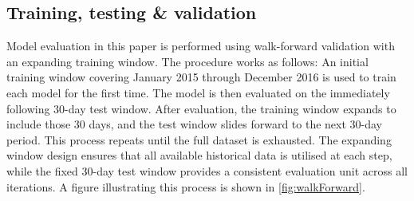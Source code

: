 \subsection{Training, testing \& validation}\label{sec:split_protocol}
Model evaluation in this paper is performed using walk-forward validation with 
an expanding training window. The procedure works as follows: An initial 
training window covering January 2015 through December 2016 is used to train
each model for the first time. The model is then evaluated on
the immediately following 30-day test window. After evaluation,
the training window expands to include those 30 days, and
the test window slides forward to the next 30-day period.
This process repeats until the full dataset is exhausted. The
expanding window design ensures that all available historical
data is utilised at each step, while the fixed 30-day test window
provides a consistent evaluation unit across all iterations. A
figure illustrating this process is shown in \autoref{fig:walkForward}. 
